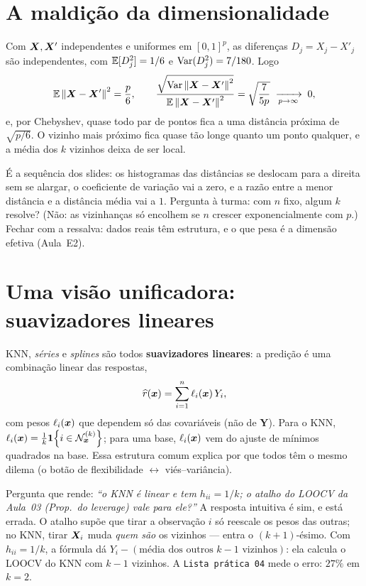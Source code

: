 \documentclass[11pt,a4paper]{article}
\begin{document}
\section{A maldição da dimensionalidade}
Com $\bm{X},\bm{X}'$ independentes e uniformes em $[0,1]^p$, as diferenças $D_j=X_j-X'_j$ são
independentes, com $\mathbb{E}[D_j^2]=1/6$ e $\operatorname{Var}(D_j^2)=7/180$. Logo
\[
  \mathbb{E}\left\lVert \bm{X}-\bm{X}' \right\rVert^2=\frac p6,
  \qquad
  \frac{\sqrt{\operatorname{Var}\left\lVert \bm{X}-\bm{X}' \right\rVert^2}}{\mathbb{E}\left\lVert \bm{X}-\bm{X}' \right\rVert^2}=\sqrt{\frac{7}{5p}}
  \;\xrightarrow[p\to\infty]{}\;0 ,
\]
e, por Chebyshev, quase todo par de pontos fica a uma distância próxima de
$\sqrt{p/6}$. O vizinho mais próximo fica quase tão longe quanto um ponto qualquer, e
a média dos $k$ vizinhos deixa de ser local.

\begin{emsala}
É a sequência dos slides: os histogramas das distâncias se deslocam para a direita sem
se alargar, o coeficiente de variação vai a zero, e a razão entre a menor distância e
a distância média vai a $1$. Pergunta à turma: com $n$ fixo, algum $k$ resolve? (Não:
as vizinhanças só encolhem se $n$ crescer exponencialmente com $p$.) Fechar com a
ressalva: dados reais têm estrutura, e o que pesa é a dimensão efetiva (Aula~E2).
\end{emsala}

\section{Uma visão unificadora: suavizadores lineares}
KNN, \emph{séries} e \emph{splines} são todos
\textbf{suavizadores lineares}: a predição é uma combinação linear das respostas,
\[
  \widehat{r}(\bm{x}) = \sum_{i=1}^n \ell_i(\bm{x})\,Y_i,
\]
com pesos $\ell_i(\bm{x})$ que dependem só das covariáveis (não de $\bm{Y}$). Para o
KNN, $\ell_i(\bm{x})=\tfrac1k\mathbf{1}\!\left\{i\in\mathcal{N}_{\bm{x}}^{(k)}\right\}$; para uma base, $\ell_i(\bm{x})$ vem
do ajuste de mínimos quadrados na base.
Essa estrutura comum explica por que todos têm o mesmo dilema (o botão de
flexibilidade $\leftrightarrow$ viés--variância).

\begin{emsala}
Pergunta que rende: \emph{``o KNN é linear e tem $h_{ii}=1/k$; o atalho do LOOCV da
Aula~03 (Prop.\ do \emph{leverage}) vale para ele?''} A resposta intuitiva é sim, e
está errada. O atalho supõe que tirar a observação $i$ só reescale os pesos das
outras; no KNN, tirar $\bm{X}_i$ muda \emph{quem são} os vizinhos --- entra o
$(k+1)$-ésimo. Com $h_{ii}=1/k$, a fórmula dá
$Y_i-(\text{média dos outros } k-1 \text{ vizinhos})$: ela calcula o LOOCV do KNN com
$k-1$ vizinhos. A \texttt{Lista prática 04} mede o erro: $27\%$ em $k=2$.
\end{emsala}
\end{document}
